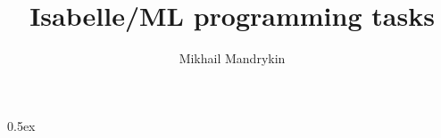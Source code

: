 \documentclass[11pt,a4paper]{article}
\begin{document}
\title{Isabelle/ML programming tasks}
\author{Mikhail Mandrykin}
\maketitle

\tableofcontents\newpage

\parindent 0pt\parskip 0.5ex



%
%
\end{document}
